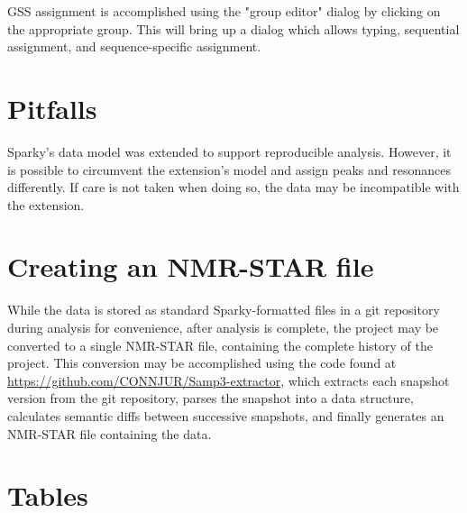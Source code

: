 GSS assignment is accomplished using the "group editor" dialog by clicking on
the appropriate group.  This will bring up a dialog which allows typing,
sequential assignment, and sequence-specific assignment.



\section{Pitfalls}
Sparky's data model was extended to support reproducible analysis.
However, it is possible to circumvent the extension's model and assign peaks
and resonances differently. If care is not taken when doing so, the data
may be incompatible with the extension.



\section{Creating an NMR-STAR file}
While the data is stored as standard Sparky-formatted files in a git repository
during analysis for convenience, after analysis is complete, the project
may be converted to a single NMR-STAR file, containing the complete history
of the project.  This conversion may be accomplished using the code found at
\url{https://github.com/CONNJUR/Samp3-extractor}, which extracts each snapshot 
version from the git repository, parses the snapshot into a data structure,
calculates semantic diffs between successive snapshots, 
and finally generates an NMR-STAR file containing the data.

 

\clearpage
\section{Tables}

